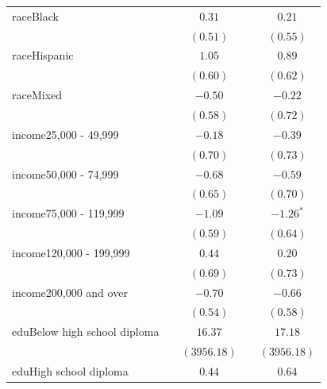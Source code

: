 \documentclass[
  12,
  letterpaper,
  DIV=11,
  numbers=noendperiod]{scrartcl}
\begin{document}
\begin{table}
{\begin{center}
\begin{tabular}{l c c c c}
raceBlack                       &               & $0.31$        &               & $0.21$        \\
                                &               & $(0.51)$      &               & $(0.55)$      \\
raceHispanic                    &               & $1.05$        &               & $0.89$        \\
                                &               & $(0.60)$      &               & $(0.62)$      \\
raceMixed                       &               & $-0.50$       &               & $-0.22$       \\
                                &               & $(0.58)$      &               & $(0.72)$      \\
income25,000 - 49,999           &               & $-0.18$       &               & $-0.39$       \\
                                &               & $(0.70)$      &               & $(0.73)$      \\
income50,000 - 74,999           &               & $-0.68$       &               & $-0.59$       \\
                                &               & $(0.65)$      &               & $(0.70)$      \\
income75,000 - 119,999          &               & $-1.09$       &               & $-1.26^{*}$   \\
                                &               & $(0.59)$      &               & $(0.64)$      \\
income120,000 - 199,999         &               & $0.44$        &               & $0.20$        \\
                                &               & $(0.69)$      &               & $(0.73)$      \\
income200,000 and over          &               & $-0.70$       &               & $-0.66$       \\
                                &               & $(0.54)$      &               & $(0.58)$      \\
eduBelow high school diploma    &               & $16.37$       &               & $17.18$       \\
                                &               & $(3956.18)$   &               & $(3956.18)$   \\
eduHigh school diploma          &               & $0.44$        &               & $0.64$        \\

\end{tabular}
\end{center}}
\end{table}
\end{document}
